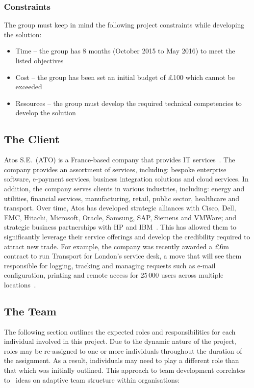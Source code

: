 \subsubsection{Constraints}

The group must keep in mind the following project constraints while developing the solution:

\begin{itemize}
	\item Time -- the group has 8 months (October 2015 to May 2016) to meet the listed objectives
	\item Cost -- the group has been set an initial budget of \pounds 100 which cannot be exceeded
	\item Resources -- the group must develop the required technical competencies to develop the solution
\end{itemize}

\subsection{The Client}

Atos S.E.~(ATO) is a France-based company that provides IT services~\parencite{web:reuters}. The company provides an assortment of services, including: bespoke enterprise software, e-payment services, business integration solutions and cloud services. In addition, the company serves clients in various industries, including: energy and utilities, financial services, manufacturing, retail, public sector, healthcare and transport. Over time, Atos has developed strategic alliances with Cisco, Dell, EMC, Hitachi, Microsoft, Oracle, Samsung, SAP, Siemens and VMWare; and strategic business partnerships with HP and IBM~\parencite{web:bloomberg}. This has allowed them to significantly leverage their service offerings and develop the credibility required to attract new trade. For example, the company was recently awarded a \pounds 6m contract to run Transport for London's service desk, a move that will see them responsible for logging, tracking and managing requests such as e-mail configuration, printing and remote access for 25\,000 users across multiple locations~\parencite{web:jee}.

\subsection{The Team}

The following section outlines the expected roles and responsibilities for each individual involved in this project. Due to the dynamic nature of the project, roles may be re-assigned to one or more individuals throughout the duration of the assignment. As a result, individuals may need to play a different role than that which was initially outlined. This approach to team development correlates to~\textcite{book:xteams} ideas on adaptive team structure within organisations:

